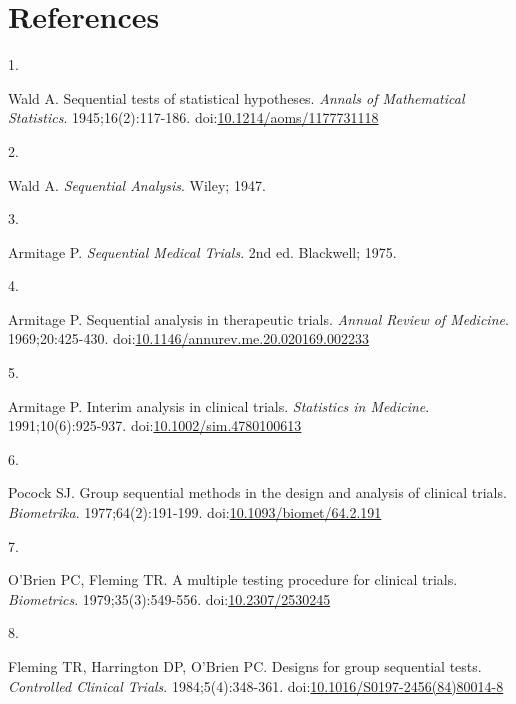\documentclass[
  11pt,
]{article}
\newlength{\cslhangindent}
\newlength{\csllabelwidth}
\newenvironment{CSLReferences}[2] %
 {\begin{list}{}{%
  \setlength{\itemindent}{0pt}
  \setlength{\leftmargin}{0pt}
  \setlength{\parsep}{0pt}
  \ifodd #1
   \setlength{\leftmargin}{\cslhangindent}
   \setlength{\itemindent}{-1\cslhangindent}
  \fi
  \setlength{\itemsep}{#2\baselineskip}}}
 {\end{list}}
\newcommand{\CSLLeftMargin}[1]{\parbox[t]{\csllabelwidth}{\strut#1\strut}}
\newcommand{\CSLRightInline}[1]{\parbox[t]{\linewidth - \csllabelwidth}{\strut#1\strut}}
\begin{document}
\section*{References}\label{references}

\protect{}\label{refs}
\begin{CSLReferences}{0}{1}
\CSLLeftMargin{1. }%
\CSLRightInline{Wald A. Sequential tests of statistical hypotheses. \emph{Annals of Mathematical Statistics}. 1945;16(2):117-186. doi:\href{https://doi.org/10.1214/aoms/1177731118}{10.1214/aoms/1177731118}}

\CSLLeftMargin{2. }%
\CSLRightInline{Wald A. \emph{Sequential Analysis}. Wiley; 1947.}

\CSLLeftMargin{3. }%
\CSLRightInline{Armitage P. \emph{Sequential Medical Trials}. 2nd ed. Blackwell; 1975.}

\CSLLeftMargin{4. }%
\CSLRightInline{Armitage P. Sequential analysis in therapeutic trials. \emph{Annual Review of Medicine}. 1969;20:425-430. doi:\href{https://doi.org/10.1146/annurev.me.20.020169.002233}{10.1146/annurev.me.20.020169.002233}}

\CSLLeftMargin{5. }%
\CSLRightInline{Armitage P. Interim analysis in clinical trials. \emph{Statistics in Medicine}. 1991;10(6):925-937. doi:\href{https://doi.org/10.1002/sim.4780100613}{10.1002/sim.4780100613}}

\CSLLeftMargin{6. }%
\CSLRightInline{Pocock SJ. Group sequential methods in the design and analysis of clinical trials. \emph{Biometrika}. 1977;64(2):191-199. doi:\href{https://doi.org/10.1093/biomet/64.2.191}{10.1093/biomet/64.2.191}}

\CSLLeftMargin{7. }%
\CSLRightInline{O'Brien PC, Fleming TR. A multiple testing procedure for clinical trials. \emph{Biometrics}. 1979;35(3):549-556. doi:\href{https://doi.org/10.2307/2530245}{10.2307/2530245}}

\CSLLeftMargin{8. }%
\CSLRightInline{Fleming TR, Harrington DP, O'Brien PC. Designs for group sequential tests. \emph{Controlled Clinical Trials}. 1984;5(4):348-361. doi:\href{https://doi.org/10.1016/S0197-2456(84)80014-8}{10.1016/S0197-2456(84)80014-8}}


\end{CSLReferences}
\end{document}
